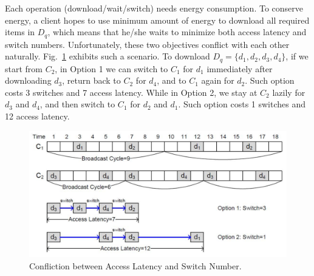 \documentclass[12pt,a4paper]{article}
\theoremstyle{definition}
\begin{document}
\begin{enumerate}
Each operation (download/wait/switch) needs energy consumption. To conserve energy, a client hopes to use minimum amount of energy to download all required items in $D_q$, which means that he/she waits to minimize both access latency and switch numbers. Unfortunately, these two objectives conflict with each other naturally. Fig.~\ref{Fig-Conflict} exhibits such a scenario. To download $D_q=\{d_1, d_2, d_3, d_4\}$, if we start from $C_2$, in Option 1 we can switch to $C_1$ for $d_1$ immediately after downloading $d_3$, return back to $C_2$ for $d_4$, and to $C_1$ again for $d_2$. Such option costs 3 switches and 7 access latency. While in Option 2, we stay at $C_2$ lazily for $d_3$ and $d_4$, and then switch to $C_1$ for $d_2$ and $d_1$. Such option costs 1 switches and 12 access latency.


\begin{figure}[!htbp]
	\centering
	\includegraphics[scale= 0.5]{Fig-Conflict.pdf}
	\caption{Confliction between Access Latency and Switch Number.} \label{Fig-Conflict}
\end{figure}


\end{enumerate}
\end{document}
